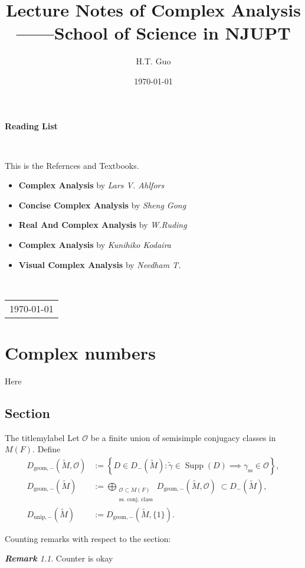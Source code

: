 \documentclass[11pt, a4paper, openany]{book}
\title{{\Huge{\textbf{Lecture Notes of Complex Analysis}}}\\——School of Science in NJUPT}
\author{H.T. Guo}
\date{\today}
\newenvironment{Proof of claim}
  {\renewcommand\qedsymbol{$\blacksquare$}\begin{proof}[Proof of claim]}
  {\end{proof}}
\newcommand{\Supp}{\operatorname{Supp}}
\theoremstyle{remark}
\newtheorem{remark}[]{\bfseries Remark}          %
\newcounter{theo}[subsection]
\theoremstyle{remark}
\theoremstyle{remark}
\theoremstyle{remark}
\begin{document}
\maketitle

\setcounter{page}{1}

\begin{center}
    \Huge\textbf{Reading List}
\end{center}~\

This is the Refernces and Textbooks.
\begin{itemize}
	\item \textbf{Complex Analysis} by \textit{Lars V. Ahlfors}
	\item \textbf{Concise Complex Analysis} by \textit{Sheng Gong}
        \item \textbf{Real And Complex Analysis} by \textit{W.Ruding}
        \item \textbf{Complex Analysis} by \textit{Kunihiko Kodaira}
        \item \textbf{Visual Complex Analysis} by \textit{Needham T.}
        
\end{itemize}
~\\
\begin{flushright}
    \begin{tabular}{c}
        \\
        \today
    \end{tabular}
\end{flushright}

\newpage
{}
\setcounter{page}{1}
\newpage
\setcounter{page}{1}
\tableofcontents

\chapter{Complex numbers}

Here

\section{Section}
\begin{Definition}{The title}{mylabel}
	Let $\mathcal{O}$ be a finite union of semisimple conjugacy classes in $M(F)$. Define
	\begin{align*}
		D_{\mathrm{geom},-}(\tilde{M}, \mathcal{O}) & := \left\{ D \in D_-(\tilde{M}) : \tilde{\gamma} \in \Supp(D) \implies \gamma_{\text{ss}} \in \mathcal{O} \right\}, \\
		D_{\mathrm{geom}, -}(\tilde{M}) & := \bigoplus_{\substack{\mathcal{O} \subset M(F) \\ \text{ss.\ conj.\ class} }} D_{\mathrm{geom},-}(\tilde{M}, \mathcal{O}) \; \subset D_-(\tilde{M}), \\
		D_{\mathrm{unip}, -}(\tilde{M}) & := D_{\mathrm{geom}, -}(\tilde{M}, \{1\}).
	\end{align*}
\end{Definition}
Counting remarks with respect to the section:
\begin{remark}
Counter is okay
\end{remark}
\end{document}
